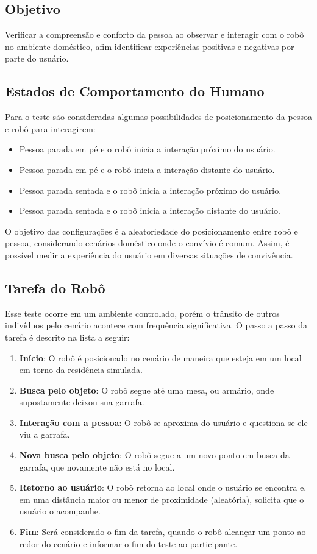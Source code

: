 \subsection{Objetivo}

Verificar a compreensão e conforto da pessoa ao observar e interagir com o robô no ambiente doméstico, afim identificar experiências positivas e negativas por parte do usuário.

\subsection{Estados de Comportamento do Humano}

Para o teste são consideradas algumas possibilidades de posicionamento da pessoa e robô para interagirem:

\begin{itemize}
	\item Pessoa parada em pé e o robô inicia a interação próximo do usuário.
	\item Pessoa parada em pé e o robô inicia a interação distante do usuário.
	\item Pessoa parada sentada e o robô inicia a interação próximo do usuário.
	\item Pessoa parada sentada e o robô inicia a interação distante do usuário.
\end{itemize}

O objetivo das configurações é a aleatoriedade do posicionamento entre robô e pessoa, considerando cenários doméstico onde o convívio é comum. Assim, é possível medir a experiência do usuário em diversas situações de convivência.

\subsection{Tarefa do Robô}

Esse teste ocorre em um ambiente controlado, porém o trânsito de outros indivíduos pelo cenário acontece com frequência significativa. O passo a passo da tarefa é descrito na lista a seguir:

\begin{enumerate}
	\item \textbf{Início}: O robô é posicionado no cenário de maneira que esteja em um local em torno da residência simulada.
	\item \textbf{Busca pelo objeto}: O robô segue até uma mesa, ou armário, onde supostamente deixou sua garrafa.
	\item \textbf{Interação com a pessoa}: O robô se aproxima do usuário e questiona se ele viu a garrafa.
	\item \textbf{Nova busca pelo objeto}: O robô segue a um novo ponto em busca da garrafa, que novamente não está no local.
	\item \textbf{Retorno ao usuário}: O robô retorna ao local onde o usuário se encontra e, em uma distância maior ou menor de proximidade (aleatória), solicita que o usuário o acompanhe.
	\item \textbf{Fim}: Será considerado o fim da tarefa, quando o robô alcançar um ponto ao redor do cenário e informar o fim do teste ao participante.
\end{enumerate}

